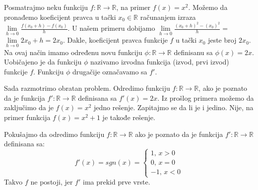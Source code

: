 \documentclass{article}
\begin{document}
Posmatrajmo neku funkciju $f: \mathbb{R} \longrightarrow \mathbb{R}$, na primer
$f(x) = x^2$. Možemo da pronađemo koeficijent pravca u tački
$x_0 \in \mathbb{R}$ računanjem izraza $\lim\limits_{h \to 0} \frac{f(x_0+h) - f(x_0)}{h}$.
U našem primeru dobijamo
$\lim\limits_{h \to 0} \frac{(x_0+h)^2 - (x_0)^2}{h} = $
$\lim\limits_{h \to 0} 2 x_0 + h = 2 x_0$.
Dakle, koeficijent pravca funkcije $f$ u tački $x_0$ jeste broj $2 x_0$.
Na ovaj način imamo određenu novu funkciju
$\phi : \mathbb{R} \longrightarrow \mathbb{R}$ definisanu
sa $\phi(x) = 2 x$. Uobičajeno je da funkciju $\phi$ nazivamo
izvodna funkcija (izvod, prvi izvod) funkcije $f$.
Funkciju $\phi$ drugačije označavamo sa $f'$.\par
Sada razmotrimo obratan problem. Odredimo funkciju $f: \mathbb{R} \longrightarrow \mathbb{R}$,
ako je poznato da je funkcija
$f': \mathbb{R} \longrightarrow \mathbb{R}$ definisana sa
$f'(x) = 2 x$. Iz prošlog primera možemo da zaključimo da je $f(x) = x^2$ jedno rešenje. Zapitajmo
se da li je i jedino. Nije, na primer funkcija $f(x) = x^2 + 1$
je takođe rešenje.\par
Pokušajmo da odredimo funkciju $f: \mathbb{R} \longrightarrow \mathbb{R}$ ako je
poznato da je funkcija $f': \mathbb{R} \longrightarrow \mathbb{R}$
definisana sa:
$$
    f'(x) = sgn(x)=
    \begin{cases}
        1\text{, }x > 0 \\
        0\text{, }x = 0 \\
        -1\text{, }x < 0
    \end{cases}
$$
Takvo $f$ ne postoji, jer $f'$ ima prekid prve vrste.
\end{document}
